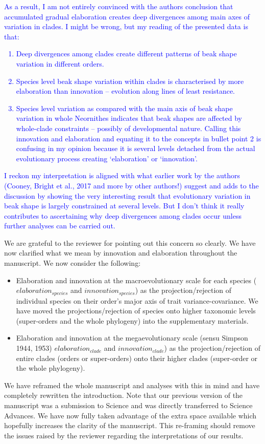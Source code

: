 \documentclass[12pt,letterpaper]{article}
\begin{document}
\textcolor{blue}{As a result, I am not entirely convinced with the authors conclusion that accumulated gradual elaboration creates deep divergences among main axes of variation in clades. I might be wrong, but my reading of the presented data is that:
\begin{enumerate}
\item Deep divergences among clades create different patterns of beak shape variation in different orders.
\item Species level beak shape variation within clades is characterised by more elaboration than innovation – evolution along lines of least resistance.
\item Species level variation as compared with the main axis of beak shape variation in whole Neornithes indicates that beak shapes are affected by whole-clade constraints – possibly of developmental nature. Calling this innovation and elaboration and equating it to the concepts in bullet point 2 is confusing in my opinion because it is several levels detached from the actual evolutionary process creating ‘elaboration’ or ‘innovation’.
\end{enumerate}
I reckon my interpretation is aligned with what earlier work by the authors (Cooney, Bright et al., 2017 and more by other authors!) suggest and adds to the discussion by showing the very interesting result that evolutionary variation in beak shape is largely constrained at several levels. But I don’t think it really contributes to ascertaining why deep divergences among clades occur unless further analyses can be carried out.}

We are grateful to the reviewer for pointing out this concern so clearly. We have now clarified what we mean by innovation and elaboration throughout the manuscript. We now consider the following:
\begin{itemize}
    \item Elaboration and innovation at the macroevolutionary scale for each species ($elaboration_{species}$ and $innovation_{species}$) as the projection/rejection of individual species on their order’s major axis of trait variance-covariance. We have moved the projections/rejection of species onto higher taxonomic levels (super-orders and the whole phylogeny) into the supplementary materials.
    \item Elaboration and innovation at the megaevolutionary scale (sensu Simpson 1944, 1953) $elaboration_{clade}$ and $innovation_{clade}$) as the projection/rejection of entire clades (orders or super-orders) onto their higher clades (super-order or the whole phylogeny).
\end{itemize}
We have reframed the whole manuscript and analyses with this in mind and have completely rewritten the introduction. Note that our previous version of the manuscript was a submission to Science and was directly transferred to Science Advances. We have now fully taken advantage of the extra space available which hopefully increases the clarity of the manuscript. This re-framing should remove the issues raised by the reviewer regarding the interpretations of our results.
\end{document}
